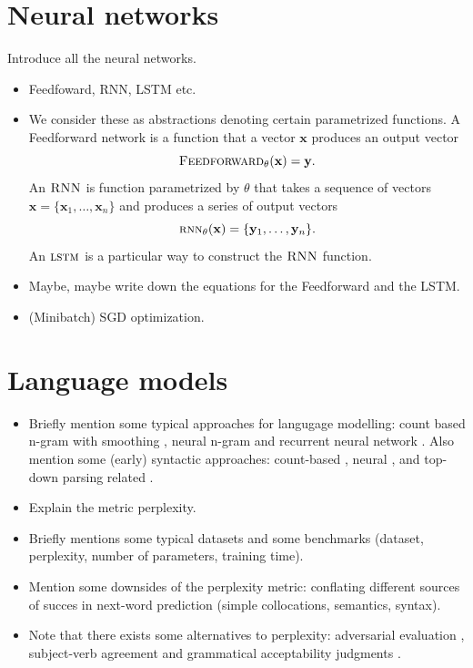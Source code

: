 \section{Neural networks}
Introduce all the neural networks.
\begin{itemize}
  \item Feedfoward, RNN, LSTM etc.
  \item We consider these as abstractions denoting certain parametrized functions. A Feedforward network is a function that a vector $\mathbf{x}$ produces an output vector
  \begin{equation*}
    \textsc{Feedforward}_{\theta}( \mathbf{x} ) = \mathbf{y}.
  \end{equation*}
  An $\textsc{RNN}$ is function parametrized by $\theta$ that takes a sequence of vectors $\mathbf{x} = \{ \mathbf{x}_1, \dots, \mathbf{x}_n \}$  and produces a series of output vectors
  \begin{equation*}
    \textsc{rnn}_{\theta}( \mathbf{x} ) = \{ \mathbf{y}_1, \dots, \mathbf{y}_n \}.
  \end{equation*}
  An $\textsc{lstm}$ is a particular way to construct the $\textsc{RNN}$ function.
  \item Maybe, maybe write down the equations for the Feedforward and the LSTM.
  \item (Minibatch) SGD optimization.
\end{itemize}

\section{Language models}
\begin{itemize}
  \item Briefly mention some typical approaches for langugage modelling: count based n-gram with smoothing \citep{Goodman+1996,Kneser+1995}, neural n-gram \citep{Bengio+2003} and recurrent neural network \citep{Mikolov+2010}. Also mention some (early) syntactic approaches: count-based \citep{Chelba2000,Klein:2012:treelets}, neural \citep{Emami+2005}, and top-down parsing related \citep{Roark2001}.
  \item Explain the metric perplexity.
  \item Briefly mentions some typical datasets and some benchmarks (dataset, perplexity, number of parameters, training time).
  \item Mention some downsides of the perplexity metric: conflating different sources of succes in next-word prediction (simple collocations, semantics, syntax).
  \item Note that there exists some alternatives to perplexity: adversarial evaluation \citep{Smith2012:adversarial}, subject-verb agreement \citep{Linzen+2016:LSTM-syntax} and grammatical acceptability judgments \citep{Linzen+2018:targeted}.
\end{itemize}

